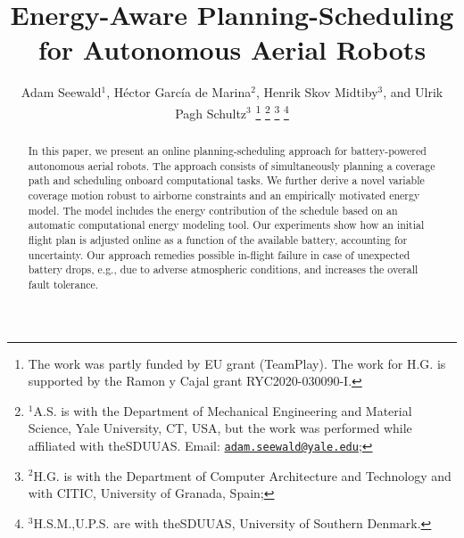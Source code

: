 \documentclass[letterpaper,10pt,conference,twoside]{IEEEtran}
\theoremstyle{definition}
\begin{document}

\title{\vspace{6mm}\bfseries\LARGE Energy-Aware Planning-Scheduling for Autonomous Aerial Robots}

\author{
  Adam Seewald$^{\text{1}}$, H\'ector Garc\'ia de Marina$^{\text{2}}$, Henrik Skov Midtiby$^{\text{3}}$, and Ulrik Pagh Schultz$^{\text{3}}$
  \thanks{The work was partly funded by EU grant  (TeamPlay). The work for H.\hspace*{.4ex}G. is supported by the Ramon y Cajal grant \textnumero RYC2020-030090-I.}
  \thanks{$^{\text{1}}$A.\hspace*{.4ex}S. is with the Department of Mechanical Engineering and Material Science, Yale University, CT, USA, but the work was performed while affiliated with the\hspace*{.6ex}SDU\hspace*{.4ex}UAS. Email: {\tt\footnotesize \href{mailto:adam.seewald@yale.edu}{adam.seewald@yale.edu}};}
  \thanks{$^{\text{2}}$H.\hspace*{.4ex}G. is with the Department of Computer Architecture and Technology and with CITIC, University of Granada, Spain;} 
  \thanks{$^{\text{3}}$H.\hspace*{.3ex}S.\hspace*{.3ex}M.,\hspace*{.5ex}U.\hspace*{.3ex}P.\hspace*{.3ex}S. are with the\hspace*{.5ex}SDU\hspace*{.3ex}UAS, %
  University of Southern Denmark.}
}


\maketitle

\vspace*{-.6ex}
\begin{abstract}
  In this paper, we present an online planning-scheduling approach for battery-powered autonomous aerial robots. The approach consists of simultaneously planning a coverage path and scheduling onboard computational tasks. We further derive a novel variable coverage motion robust to airborne constraints and an empirically motivated energy model. The model includes the energy contribution of the schedule based on an automatic computational energy modeling tool. Our experiments show how an initial flight plan is adjusted online as a function of the available battery, accounting for uncertainty. Our approach %
  remedies possible in-flight failure in case of unexpected battery drops, e.g., due to adverse atmospheric conditions, and increases the overall fault tolerance.
\end{abstract}
\end{document}
